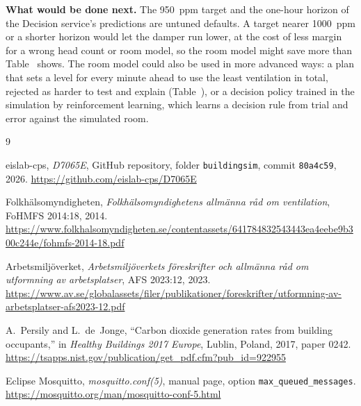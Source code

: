 \documentclass[11pt]{article}
\def\ref#1{\getrefnumber{#1}}%
\begin{document}
\textbf{What would be done next.} The 950~ppm target and the one-hour
horizon of the Decision service's predictions are untuned defaults. A target nearer 1000~ppm or a shorter
horizon would let the damper run lower, at the cost of less margin for a
wrong head count or room model, so the room model might save more than
Table~\ref{tab:comparison} shows. The room model could also be used in
more advanced ways: a plan that sets a level for every minute ahead to
use the least ventilation in total, rejected as harder to test and explain
(Table~\ref{tab:decisions}), or a decision policy trained in the
simulation by reinforcement learning, which learns a decision rule from
trial and error against the simulated room.

\begin{thebibliography}{9}

eislab-cps, \emph{D7065E}, GitHub repository, folder
\texttt{buildingsim}, commit \texttt{80a4c59}, 2026.
\url{https://github.com/eislab-cps/D7065E}

Folkhälsomyndigheten, \emph{Folkhälsomyndighetens allmänna råd om
ventilation}, FoHMFS 2014:18, 2014.
\url{https://www.folkhalsomyndigheten.se/contentassets/641784832543443ea4eebe9b300c244e/fohmfs-2014-18.pdf}

Arbetsmiljöverket, \emph{Arbetsmiljöverkets föreskrifter och allmänna
råd om utformning av arbetsplatser}, AFS 2023:12, 2023.
\url{https://www.av.se/globalassets/filer/publikationer/foreskrifter/utformning-av-arbetsplatser-afs2023-12.pdf}

A.~Persily and L.~de~Jonge, ``Carbon dioxide generation rates from
building occupants,'' in \emph{Healthy Buildings 2017 Europe}, Lublin,
Poland, 2017, paper 0242.
\url{https://tsapps.nist.gov/publication/get_pdf.cfm?pub_id=922955}

Eclipse Mosquitto, \emph{mosquitto.conf(5)}, manual page, option
\texttt{max\_queued\_messages}.
\url{https://mosquitto.org/man/mosquitto-conf-5.html}

\end{thebibliography}
\end{document}
